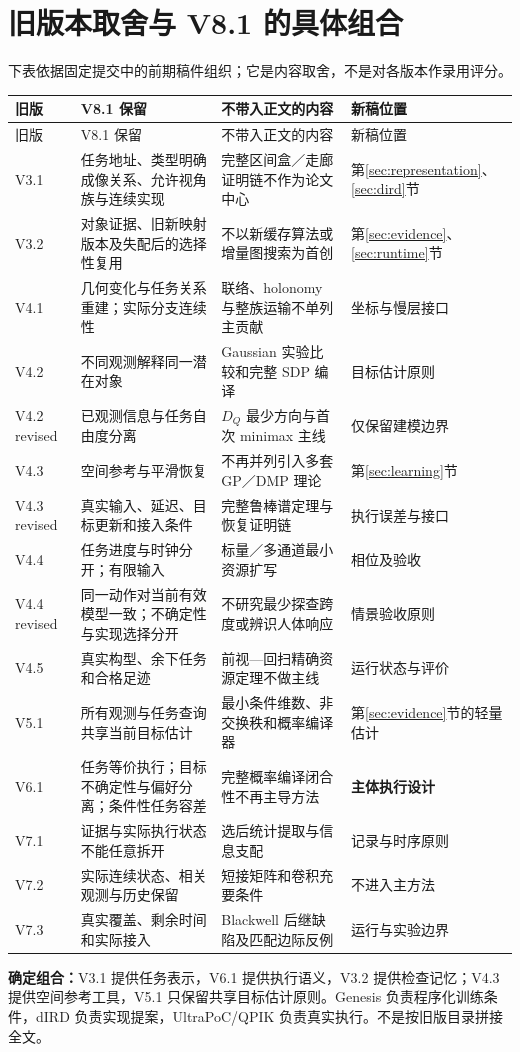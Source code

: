\documentclass[UTF8,11pt,a4paper,fontset=fandol]{ctexart}
\numberwithin{equation}{section}
\theoremstyle{definition}
\begin{document}
\section{旧版本取舍与 V8.1 的具体组合}
\label{app:versions}
下表依据固定提交中的前期稿件\cite{repoversions}组织；它是内容取舍，不是对各版本作录用评分。
\small
\begin{longtable}{@{}P{23mm}P{48mm}P{44mm}P{35mm}@{}}
\toprule
旧版 & V8.1 保留 & 不带入正文的内容 & 新稿位置\\\midrule
\endfirsthead
\toprule 旧版 & V8.1 保留 & 不带入正文的内容 & 新稿位置\\\midrule
\endhead
V3.1 & 任务地址、类型明确成像关系、允许视角族与连续实现 & 完整区间盒／走廊证明链不作为论文中心 & 第\ref{sec:representation}、\ref{sec:dird}节\\
V3.2 & 对象证据、旧新映射版本及失配后的选择性复用 & 不以新缓存算法或增量图搜索为首创 & 第\ref{sec:evidence}、\ref{sec:runtime}节\\
V4.1 & 几何变化与任务关系重建；实际分支连续性 & 联络、holonomy 与整族运输不单列主贡献 & 坐标与慢层接口\\
V4.2 & 不同观测解释同一潜在对象 & Gaussian 实验比较和完整 SDP 编译 & 目标估计原则\\
V4.2 revised & 已观测信息与任务自由度分离 & $D_Q$ 最少方向与首次 minimax 主线 & 仅保留建模边界\\
V4.3 & 空间参考与平滑恢复 & 不再并列引入多套 GP／DMP 理论 & 第\ref{sec:learning}节\\
V4.3 revised & 真实输入、延迟、目标更新和接入条件 & 完整鲁棒谱定理与恢复证明链 & 执行误差与接口\\
V4.4 & 任务进度与时钟分开；有限输入 & 标量／多通道最小资源扩写 & 相位及验收\\
V4.4 revised & 同一动作对当前有效模型一致；不确定性与实现选择分开 & 不研究最少探查跨度或辨识人体响应 & 情景验收原则\\
V4.5 & 真实构型、余下任务和合格足迹 & 前视—回扫精确资源定理不做主线 & 运行状态与评价\\
V5.1 & 所有观测与任务查询共享当前目标估计 & 最小条件维数、非交换秩和概率编译器 & 第\ref{sec:evidence}节的轻量估计\\
V6.1 & 任务等价执行；目标不确定性与偏好分离；条件性任务容差 & 完整概率编译闭合性不再主导方法 & \textbf{主体执行设计}\\
V7.1 & 证据与实际执行状态不能任意拆开 & 选后统计提取与信息支配 & 记录与时序原则\\
V7.2 & 实际连续状态、相关观测与历史保留 & 短接矩阵和卷积充要条件 & 不进入主方法\\
V7.3 & 真实覆盖、剩余时间和实际接入 & Blackwell 后继缺陷及匹配边际反例 & 运行与实验边界\\\bottomrule
\end{longtable}
\normalsize
\textbf{确定组合：}V3.1 提供任务表示，V6.1 提供执行语义，V3.2 提供检查记忆；V4.3 提供空间参考工具，V5.1 只保留共享目标估计原则。Genesis 负责程序化训练条件，dIRD 负责实现提案，UltraPoC/QPIK 负责真实执行。不是按旧版目录拼接全文。
\end{document}
